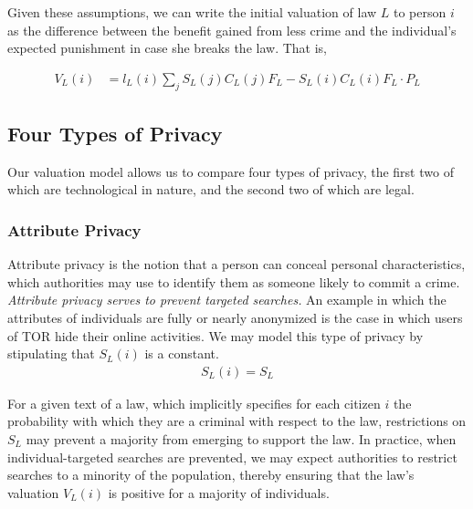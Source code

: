 Given these assumptions, we can write the initial valuation of law $L$ to person $i$ as the difference between the benefit gained from less crime and the individual's expected punishment in case she breaks the law. That is,  

\begin{align}
\label{eq:valuation}
V_L(i) &= l_L(i) \sum_j S_L(j)C_L(j)F_L - S_L(i)C_L(i)F_L\cdot P_L 
\end{align}


\subsection{Four Types of Privacy}
Our valuation model allows us to compare four types of privacy, the first two of which are technological in nature, and the second  two of which are legal.

\subsubsection{Attribute Privacy}

Attribute privacy is the notion that a person can conceal personal characteristics, which authorities may use to identify them as someone likely to commit a crime. \emph{Attribute privacy serves to prevent targeted searches.}  An example in which the attributes of individuals are fully or nearly anonymized is the case in which users of TOR hide their online activities. We may model this type of privacy by stipulating that $S_L(i)$ is a constant.
\begin{align}
S_L(i)=S_L
\end{align}

For a given text of a law, which implicitly specifies for each citizen $i$ the probability with which they are a criminal with respect to the law, restrictions on $S_L$ %
may prevent a majority from emerging to support the law.  %
 In practice, when individual-targeted searches are prevented, we may expect authorities to restrict searches to a minority of the population, thereby ensuring that the law's valuation $V_L(i)$ is positive for a majority of individuals.

